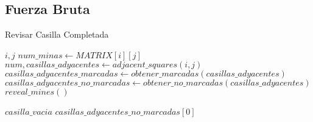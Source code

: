 \documentclass{article}
\begin{document}
\subsection{Fuerza Bruta}

\begin{algorithm}[H]
\caption{Revisar Casilla Completada}
\begin{algorithmic}[1]
\REQUIRE $i, j$
\STATE $num\_minas \gets MATRIX[i][j]$
\STATE $num, casillas\_adyacentes \gets adjacent\_squares(i, j)$
\STATE $casillas\_adyacentes\_marcadas \gets obtener\_marcadas(casillas\_adyacentes)$
\STATE $casillas\_adyacentes\_no\_marcadas \gets obtener\_no\_marcadas(casillas\_adyacentes)$
                    \STATE $reveal\_mines()$
                    
                \ENDIF
                \RETURN $casilla\_vacia$
            \ENDIF
        \ENDIF
    \ENDFOR
\ENDIF
\RETURN $casillas\_adyacentes\_no\_marcadas[0]$
\end{algorithmic}
\end{algorithm}
\end{document}
